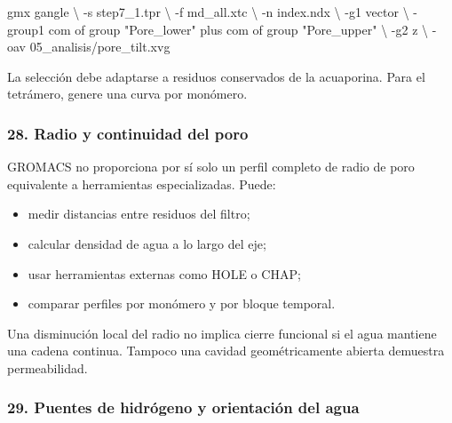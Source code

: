 \documentclass[
  spanish,
  11pt,
  a4paper]{article}
\newenvironment{Shaded}{\begin{snugshade}}{\end{snugshade}}
\newcommand{\AttributeTok}[1]{\textcolor[rgb]{0.13,0.29,0.53}{#1}}
\newcommand{\DataTypeTok}[1]{\textcolor[rgb]{0.13,0.29,0.53}{#1}}
\newcommand{\ExtensionTok}[1]{#1}
\newcommand{\NormalTok}[1]{#1}
\newcommand{\StringTok}[1]{\textcolor[rgb]{0.31,0.60,0.02}{#1}}
\providecommand{\tightlist}{%
  \setlength{\itemsep}{0pt}\setlength{\parskip}{0pt}}
\begin{document}
\begin{Shaded}
\begin{Highlighting}[]
\ExtensionTok{gmx}\NormalTok{ gangle }\DataTypeTok{\textbackslash{}}
    \AttributeTok{{-}s}\NormalTok{ step7\_1.tpr }\DataTypeTok{\textbackslash{}}
    \AttributeTok{{-}f}\NormalTok{ md\_all.xtc }\DataTypeTok{\textbackslash{}}
    \AttributeTok{{-}n}\NormalTok{ index.ndx }\DataTypeTok{\textbackslash{}}
    \AttributeTok{{-}g1}\NormalTok{ vector }\DataTypeTok{\textbackslash{}}
    \AttributeTok{{-}group1} \StringTok{\textquotesingle{}com of group "Pore\_lower" plus com of group "Pore\_upper"\textquotesingle{}} \DataTypeTok{\textbackslash{}}
    \AttributeTok{{-}g2}\NormalTok{ z }\DataTypeTok{\textbackslash{}}
    \AttributeTok{{-}oav}\NormalTok{ 05\_analisis/pore\_tilt.xvg}
\end{Highlighting}
\end{Shaded}

La selección debe adaptarse a residuos conservados de la acuaporina.
Para el tetrámero, genere una curva por monómero.

\subsubsection{28. Radio y continuidad del
poro}\label{radio-y-continuidad-del-poro}

GROMACS no proporciona por sí solo un perfil completo de radio de poro
equivalente a herramientas especializadas. Puede:

\begin{itemize}
\tightlist
\item
  medir distancias entre residuos del filtro;
\item
  calcular densidad de agua a lo largo del eje;
\item
  usar herramientas externas como HOLE o CHAP;
\item
  comparar perfiles por monómero y por bloque temporal.
\end{itemize}

Una disminución local del radio no implica cierre funcional si el agua
mantiene una cadena continua. Tampoco una cavidad geométricamente
abierta demuestra permeabilidad.

\subsubsection{29. Puentes de hidrógeno y orientación del
agua}\label{puentes-de-hidruxf3geno-y-orientaciuxf3n-del-agua}
\end{document}

